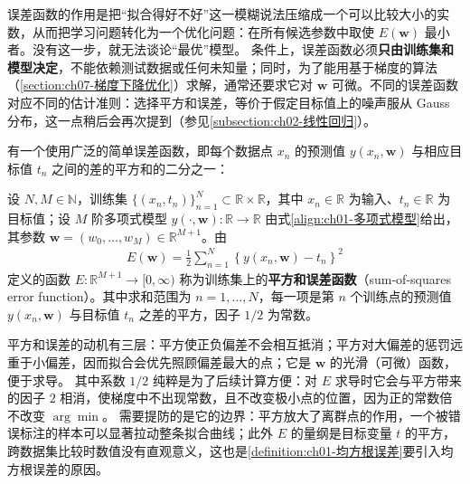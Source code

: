 \documentclass[../../main.tex]{subfiles}
\begin{document}
\begin{remark}
误差函数的作用是把“拟合得好不好”这一模糊说法压缩成一个可以比较大小的实数，从而把学习问题转化为一个优化问题：在所有候选参数中取使 $E(\mathbf{w})$ 最小者。没有这一步，就无法谈论“最优”模型。
条件上，误差函数必须\textbf{只由训练集和模型决定}，不能依赖测试数据或任何未知量；同时，为了能用基于梯度的算法（\cref{section:ch07-梯度下降优化}）求解，通常还要求它对 $\mathbf{w}$ 可微。不同的误差函数对应不同的估计准则：选择平方和误差，等价于假定目标值上的噪声服从 Gauss 分布，这一点稍后会再次提到（参见\cref{subsection:ch02-线性回归}）。
\end{remark}

有一个使用广泛的简单误差函数，即每个数据点 $x_n$ 的预测值 $y(x_n,\mathbf{w})$ 与相应目标值 $t_n$ 之间的差的平方和的二分之一：

\begin{definition}[平方和误差函数]\label{definition:ch01-平方和误差函数}
设 $N,M\in\mathbb{N}$，训练集 $\{(x_n,t_n)\}_{n=1}^{N}\subset\mathbb{R}\times\mathbb{R}$，其中 $x_n\in\mathbb{R}$ 为输入、$t_n\in\mathbb{R}$ 为目标值；设 $M$ 阶多项式模型 $y(\cdot,\mathbf{w}):\mathbb{R}\to\mathbb{R}$ 由式\eqref{align:ch01-多项式模型}给出，其参数 $\mathbf{w}=(w_0,\dots,w_M)\in\mathbb{R}^{M+1}$。由
\begin{align}
  E(\mathbf{w}) = \frac{1}{2} \sum_{n=1}^{N} \left\{ y(x_n, \mathbf{w}) - t_n \right\}^2
  \label{align:ch01-平方和误差}
\end{align}
定义的函数 $E:\mathbb{R}^{M+1}\to[0,\infty)$ 称为训练集上的\textbf{平方和误差函数}（sum-of-squares error function）。其中求和范围为 $n=1,\dots,N$，每一项是第 $n$ 个训练点的预测值 $y(x_n,\mathbf{w})$ 与目标值 $t_n$ 之差的平方，因子 $1/2$ 为常数。
\end{definition}

\begin{remark}
平方和误差的动机有三层：平方使正负偏差不会相互抵消；平方对大偏差的惩罚远重于小偏差，因而拟合会优先照顾偏差最大的点；它是 $\mathbf{w}$ 的光滑（可微）函数，便于求导。
其中系数 $1/2$ 纯粹是为了后续计算方便：对 $E$ 求导时它会与平方带来的因子 $2$ 相消，使梯度中不出现常数，且不改变极小点的位置，因为正的常数倍不改变 $\arg\min$。
需要提防的是它的边界：平方放大了离群点的作用，一个被错误标注的样本可以显著拉动整条拟合曲线；此外 $E$ 的量纲是目标变量 $t$ 的平方，跨数据集比较时数值没有直观意义，这也是\cref{definition:ch01-均方根误差}要引入均方根误差的原因。
\end{remark}
\end{document}
